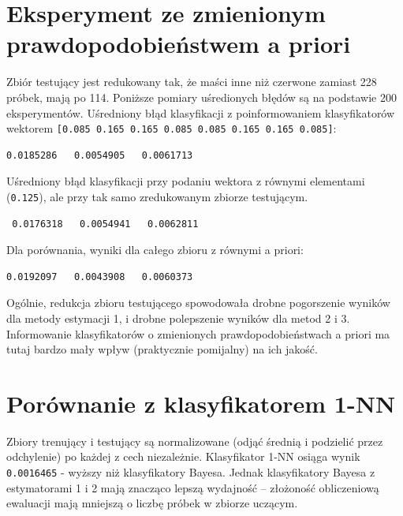 \documentclass[a4paper]{article}
\begin{document}
\section{Eksperyment ze zmienionym prawdopodobieństwem a priori}
Zbiór testujący jest redukowany tak, że maści inne niż czerwone zamiast 228 próbek, mają po 114.
Poniższe pomiary uśredionych błędów są na podstawie 200 eksperymentów.
Uśredniony błąd klasyfikacji z poinformowaniem klasyfikatorów wektorem \texttt{[0.085 0.165 0.165 0.085 0.085 0.165 0.165 0.085]}:
\begin{verbatim}
0.0185286   0.0054905   0.0061713
\end{verbatim}
Uśredniony błąd klasyfikacji przy podaniu wektora z równymi elementami (\texttt{0.125}),
ale przy tak samo zredukowanym zbiorze testującym.
\begin{verbatim}
 0.0176318   0.0054941   0.0062811
\end{verbatim}
Dla porównania, wyniki dla całego zbioru z równymi a priori:
\begin{verbatim}
0.0192097   0.0043908   0.0060373
\end{verbatim}
Ogólnie, redukcja zbioru testującego spowodowała drobne pogorszenie wyników dla metody estymacji 1,
i drobne polepszenie wyników dla metod 2 i 3.
Informowanie klasyfikatorów o zmienionych prawdopodobieństwach a priori ma tutaj bardzo mały wpływ (praktycznie pomijalny) na ich jakość.


\section{Porównanie z klasyfikatorem 1-NN}
Zbiory trenujący i testujący są normalizowane (odjąć średnią i podzielić przez odchylenie) po każdej z cech niezależnie.
Klasyfikator 1-NN osiąga wynik \texttt{0.0016465} - wyższy niż klasyfikatory Bayesa.
Jednak klasyfikatory Bayesa z estymatorami 1 i 2 mają znacząco lepszą wydajność --
złożoność obliczeniową ewaluacji mają mniejszą o liczbę próbek w zbiorze uczącym.
\end{document}
